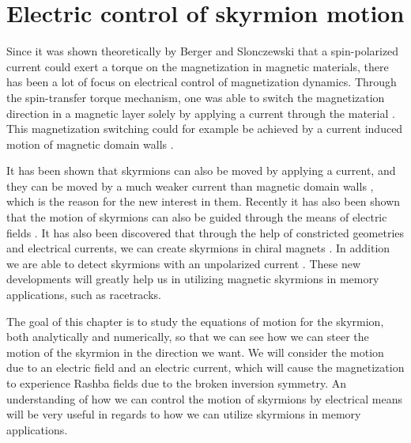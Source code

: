 \chapter{Electric control of skyrmion motion}
Since it was shown theoretically by Berger \cite{Berger1978,Berger1984,Berger1992,Berger1996} and Slonczewski \cite{Slonczewski1996} that a spin-polarized current could exert a torque on the magnetization in magnetic materials, there has been a lot of focus on electrical control of magnetization dynamics. Through the spin-transfer torque mechanism, one was able to switch the magnetization direction in a magnetic layer solely by applying a current through the material \cite{Myers1999,Sun1999,Katine2000}. This magnetization switching could for example be achieved by a current induced motion of magnetic domain walls \cite{Yamanouchi2004,Yamaguchi2004,Saitoh2004,Yamanouchi2006}. 

It has been shown that skyrmions can also be moved by applying a current, and they can be moved by a much weaker current than magnetic domain walls \cite{Jonietz2010,Yu2012}, which is the reason for the new interest in them. Recently it has also been shown that the motion of skyrmions can also be guided through the means of electric fields \cite{Upadhyaya2015}. It has also been discovered that through the help of constricted geometries and electrical currents, we can create skyrmions in chiral magnets \cite{Iwasaki2013,Sampaio2013,Jiang2015}. In addition we are able to detect skyrmions with an unpolarized current \cite{Monchesky2015}. These new developments will greatly help us in utilizing magnetic skyrmions in memory applications, such as racetracks. 

The goal of this chapter is to study the equations of motion for the skyrmion, both analytically and numerically, so that we can see how we can steer the motion of the skyrmion in the direction we want. We will consider the motion due to an electric field and an electric current, which will cause the magnetization to experience Rashba fields due to the broken inversion symmetry. An understanding of how we can control the motion of skyrmions by electrical means will be very useful in regards to how we can utilize skyrmions in memory applications.

